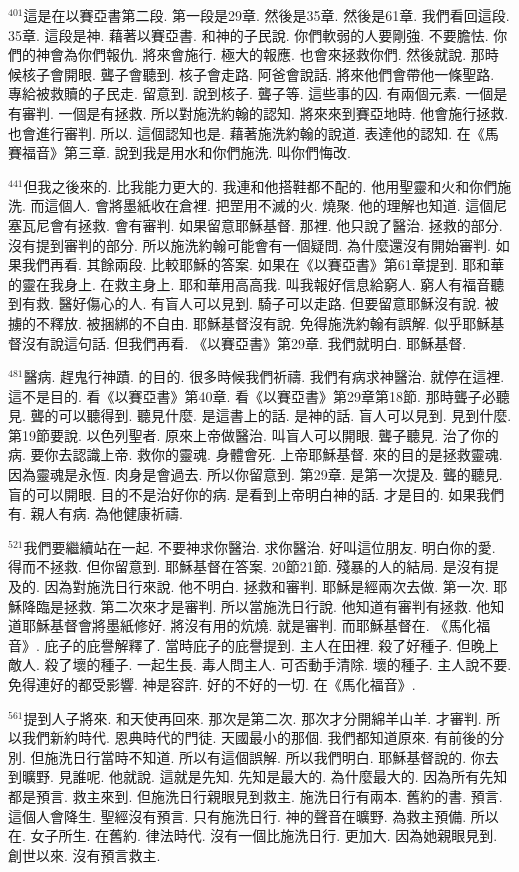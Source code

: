 \documentclass{book}
\begin{document}
$^{401}$這是在以賽亞書第二段.
第一段是29章.
然後是35章.
然後是61章.
我們看回這段.
35章.
這段是神.
藉著以賽亞書.
和神的子民說.
你們軟弱的人要剛強.
不要膽怯.
你們的神會為你們報仇.
將來會施行.
極大的報應.
也會來拯救你們.
然後就說.
那時候核子會開眼.
聾子會聽到.
核子會走路.
阿爸會說話.
將來他們會帶他一條聖路.
專給被救贖的子民走.
留意到.
說到核子.
聾子等.
這些事的囚.
有兩個元素.
一個是有審判.
一個是有拯救.
所以對施洗約翰的認知.
將來來到賽亞地時.
他會施行拯救.
也會進行審判.
所以.
這個認知也是.
藉著施洗約翰的說道.
表達他的認知.
在《馬賽福音》第三章.
說到我是用水和你們施洗.
叫你們悔改.

$^{441}$但我之後來的.
比我能力更大的.
我連和他搭鞋都不配的.
他用聖靈和火和你們施洗.
而這個人.
會將墨紙收在倉裡.
把罡用不滅的火.
燒聚.
他的理解也知道.
這個尼塞瓦尼會有拯救.
會有審判.
如果留意耶穌基督.
那裡.
他只說了醫治.
拯救的部分.
沒有提到審判的部分.
所以施洗約翰可能會有一個疑問.
為什麼還沒有開始審判.
如果我們再看.
其餘兩段.
比較耶穌的答案.
如果在《以賽亞書》第61章提到.
耶和華的靈在我身上.
在救主身上.
耶和華用高高我.
叫我報好信息給窮人.
窮人有福音聽到有救.
醫好傷心的人.
有盲人可以見到.
騎子可以走路.
但要留意耶穌沒有說.
被擄的不釋放.
被捆綁的不自由.
耶穌基督沒有說.
免得施洗約翰有誤解.
似乎耶穌基督沒有說這句話.
但我們再看.
《以賽亞書》第29章.
我們就明白.
耶穌基督.

$^{481}$醫病.
趕鬼行神蹟.
的目的.
很多時候我們祈禱.
我們有病求神醫治.
就停在這裡.
這不是目的.
看《以賽亞書》第40章.
看《以賽亞書》第29章第18節.
那時聾子必聽見.
聾的可以聽得到.
聽見什麼.
是這書上的話.
是神的話.
盲人可以見到.
見到什麼.
第19節要說.
以色列聖者.
原來上帝做醫治.
叫盲人可以開眼.
聾子聽見.
治了你的病.
要你去認識上帝.
救你的靈魂.
身體會死.
上帝耶穌基督.
來的目的是拯救靈魂.
因為靈魂是永恆.
肉身是會過去.
所以你留意到.
第29章.
是第一次提及.
聾的聽見.
盲的可以開眼.
目的不是治好你的病.
是看到上帝明白神的話.
才是目的.
如果我們有.
親人有病.
為他健康祈禱.

$^{521}$我們要繼續站在一起.
不要神求你醫治.
求你醫治.
好叫這位朋友.
明白你的愛.
得而不拯救.
但你留意到.
耶穌基督在答案.
20節21節.
殘暴的人的結局.
是沒有提及的.
因為對施洗日行來說.
他不明白.
拯救和審判.
耶穌是經兩次去做.
第一次.
耶穌降臨是拯救.
第二次來才是審判.
所以當施洗日行說.
他知道有審判有拯救.
他知道耶穌基督會將墨紙修好.
將沒有用的炕燒.
就是審判.
而耶穌基督在.
《馬化福音》.
庇子的庇譽解釋了.
當時庇子的庇譽提到.
主人在田裡.
殺了好種子.
但晚上敵人.
殺了壞的種子.
一起生長.
毒人問主人.
可否動手清除.
壞的種子.
主人說不要.
免得連好的都受影響.
神是容許.
好的不好的一切.
在《馬化福音》.

$^{561}$提到人子將來.
和天使再回來.
那次是第二次.
那次才分開綿羊山羊.
才審判.
所以我們新約時代.
恩典時代的門徒.
天國最小的那個.
我們都知道原來.
有前後的分別.
但施洗日行當時不知道.
所以有這個誤解.
所以我們明白.
耶穌基督說的.
你去到曠野.
見誰呢.
他就說.
這就是先知.
先知是最大的.
為什麼最大的.
因為所有先知都是預言.
救主來到.
但施洗日行親眼見到救主.
施洗日行有兩本.
舊約的書.
預言.
這個人會降生.
聖經沒有預言.
只有施洗日行.
神的聲音在曠野.
為救主預備.
所以在.
女子所生.
在舊約.
律法時代.
沒有一個比施洗日行.
更加大.
因為她親眼見到.
創世以來.
沒有預言救主.
\end{document}
